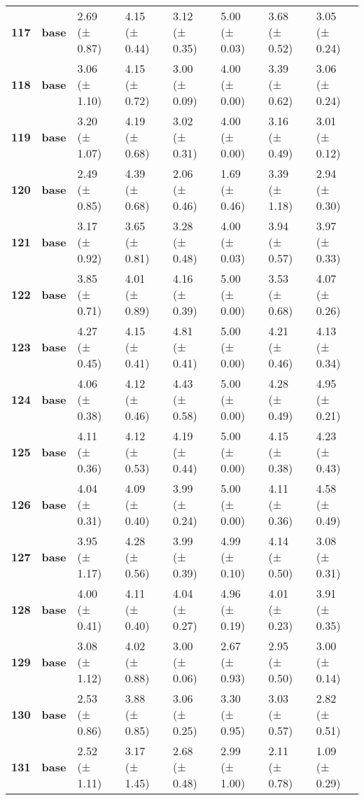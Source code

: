 \begin{longtable}{llllllll}
\cline{1-8}
\textbf{117} & \textbf{base} & 2.69 (± 0.87) & 4.15 (± 0.44) & 3.12 (± 0.35) & 5.00 (± 0.03) & 3.68 (± 0.52) & 3.05 (± 0.24) \\
\cline{1-8}
\textbf{118} & \textbf{base} & 3.06 (± 1.10) & 4.15 (± 0.72) & 3.00 (± 0.09) & 4.00 (± 0.00) & 3.39 (± 0.62) & 3.06 (± 0.24) \\
\cline{1-8}
\textbf{119} & \textbf{base} & 3.20 (± 1.07) & 4.19 (± 0.68) & 3.02 (± 0.31) & 4.00 (± 0.00) & 3.16 (± 0.49) & 3.01 (± 0.12) \\
\cline{1-8}
\textbf{120} & \textbf{base} & 2.49 (± 0.85) & 4.39 (± 0.68) & 2.06 (± 0.46) & 1.69 (± 0.46) & 3.39 (± 1.18) & 2.94 (± 0.30) \\
\cline{1-8}
\textbf{121} & \textbf{base} & 3.17 (± 0.92) & 3.65 (± 0.81) & 3.28 (± 0.48) & 4.00 (± 0.03) & 3.94 (± 0.57) & 3.97 (± 0.33) \\
\cline{1-8}
\textbf{122} & \textbf{base} & 3.85 (± 0.71) & 4.01 (± 0.89) & 4.16 (± 0.39) & 5.00 (± 0.00) & 3.53 (± 0.68) & 4.07 (± 0.26) \\
\cline{1-8}
\textbf{123} & \textbf{base} & 4.27 (± 0.45) & 4.15 (± 0.41) & 4.81 (± 0.41) & 5.00 (± 0.00) & 4.21 (± 0.46) & 4.13 (± 0.34) \\
\cline{1-8}
\textbf{124} & \textbf{base} & 4.06 (± 0.38) & 4.12 (± 0.46) & 4.43 (± 0.58) & 5.00 (± 0.00) & 4.28 (± 0.49) & 4.95 (± 0.21) \\
\cline{1-8}
\textbf{125} & \textbf{base} & 4.11 (± 0.36) & 4.12 (± 0.53) & 4.19 (± 0.44) & 5.00 (± 0.00) & 4.15 (± 0.38) & 4.23 (± 0.43) \\
\cline{1-8}
\textbf{126} & \textbf{base} & 4.04 (± 0.31) & 4.09 (± 0.40) & 3.99 (± 0.24) & 5.00 (± 0.00) & 4.11 (± 0.36) & 4.58 (± 0.49) \\
\cline{1-8}
\textbf{127} & \textbf{base} & 3.95 (± 1.17) & 4.28 (± 0.56) & 3.99 (± 0.39) & 4.99 (± 0.10) & 4.14 (± 0.50) & 3.08 (± 0.31) \\
\cline{1-8}
\textbf{128} & \textbf{base} & 4.00 (± 0.41) & 4.11 (± 0.40) & 4.04 (± 0.27) & 4.96 (± 0.19) & 4.01 (± 0.23) & 3.91 (± 0.35) \\
\cline{1-8}
\textbf{129} & \textbf{base} & 3.08 (± 1.12) & 4.02 (± 0.88) & 3.00 (± 0.06) & 2.67 (± 0.93) & 2.95 (± 0.50) & 3.00 (± 0.14) \\
\cline{1-8}
\textbf{130} & \textbf{base} & 2.53 (± 0.86) & 3.88 (± 0.85) & 3.06 (± 0.25) & 3.30 (± 0.95) & 3.03 (± 0.57) & 2.82 (± 0.51) \\
\cline{1-8}
\textbf{131} & \textbf{base} & 2.52 (± 1.11) & 3.17 (± 1.45) & 2.68 (± 0.48) & 2.99 (± 1.00) & 2.11 (± 0.78) & 1.09 (± 0.29) \\

\end{longtable}
